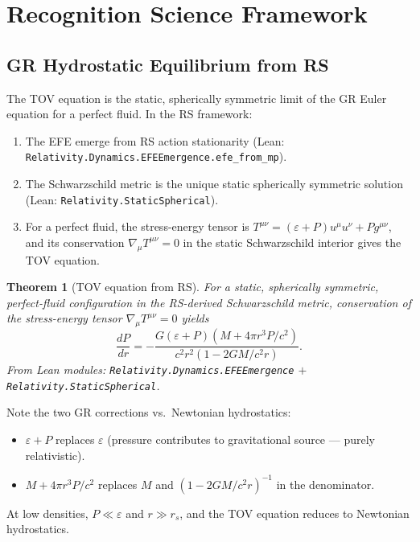 \documentclass[12pt,a4paper]{article}
\newtheorem{theorem}{Theorem}[section]
\theoremstyle{definition}
\theoremstyle{remark}
\begin{document}
\section{Recognition Science Framework}
\label{sec:rs}

\subsection{GR Hydrostatic Equilibrium from RS}

The TOV equation is the static, spherically symmetric limit of the
GR Euler equation for a perfect fluid.  In the RS framework:
\begin{enumerate}
  \item The EFE emerge from RS action stationarity
        (Lean: \texttt{Relativity.Dynamics.EFEEmergence.efe\_from\_mp}).
  \item The Schwarzschild metric is the unique static spherically
        symmetric solution (Lean: \texttt{Relativity.StaticSpherical}).
  \item For a perfect fluid, the stress-energy tensor is
        $T^{\mu\nu} = (\varepsilon + P)u^\mu u^\nu + Pg^{\mu\nu}$, and
        its conservation $\nabla_\mu T^{\mu\nu} = 0$ in the static
        Schwarzschild interior gives the TOV equation.
\end{enumerate}

\begin{theorem}[TOV equation from RS]\label{thm:tov}
For a static, spherically symmetric, perfect-fluid configuration in
the RS-derived Schwarzschild metric, conservation of the stress-energy
tensor $\nabla_\mu T^{\mu\nu} = 0$ yields
\begin{equation}
  \frac{dP}{dr} = -\frac{G(\varepsilon + P)(M + 4\pi r^3 P/c^2)}
  {c^2 r^2(1 - 2GM/c^2 r)}.
\end{equation}
From Lean modules: \texttt{Relativity.Dynamics.EFEEmergence} $+$
\texttt{Relativity.StaticSpherical}.
\end{theorem}

Note the two GR corrections vs.\ Newtonian hydrostatics:
\begin{itemize}
  \item $\varepsilon + P$ replaces $\varepsilon$ (pressure contributes
        to gravitational source — purely relativistic).
  \item $M + 4\pi r^3 P/c^2$ replaces $M$ and $(1 - 2GM/c^2 r)^{-1}$
        in the denominator.
\end{itemize}
At low densities, $P \ll \varepsilon$ and $r \gg r_s$, and the TOV
equation reduces to Newtonian hydrostatics.
\end{document}
